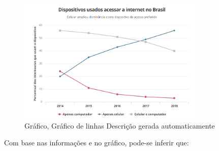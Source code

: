\begin{escolha}
\begin{boxmedio}
\begin{boxmedio}
{\begin{boxpeq}
\begin{boxpeq}
{\begin{boxpeq}
\begin{boxmedio}
\begin{boxmedio}
\begin{boxpeq}
\begin{boxmedio}
\begin{boxpeq}
\begin{boxpeq}
\begin{boxpeq}
\begin{boxpeq}
\begin{boxmedio}
{\begin{boxmedio}
\begin{boxmedio}
\begin{boxpeq}
\begin{boxmedio}
\begin{boxpeq}
\begin{boxpeq}
\begin{boxpeq}
\begin{escolha}
{\begin{boxmedio}
\begin{boxpeq}
\begin{boxpeq}
\begin{boxpeq}
\begin{boxpeq}
\begin{boxpeq}
\begin{boxmedio}
\begin{boxpeq}
\begin{boxpeq}
\begin{boxpeq}
{\begin{boxpeq}
\begin{boxmedio}
\begin{boxpeq}
\begin{boxpeq}
\begin{boxpeq}
{\begin{boxpeq}
\begin{boxmedio}
{\begin{boxpeq}
\begin{boxpeq}
\begin{boxmedio}
\begin{boxmedio}
\begin{boxpeq}
\begin{boxpeq}
{\begin{boxpeq}
\begin{boxpeq}
\begin{boxpeq}
\begin{boxpeq}
\begin{boxpeq}
\begin{escolha}
\begin{escolha}
{\begin{boxmedio}
\begin{boxpeq}
\begin{q°}
\begin{boxmedio}
\begin{boxpeq}
\begin{boxpeq}
\begin{boxmedio}
\begin{boxmedio}
\begin{boxmedio}
\begin{boxmedio}
\begin{figure}
\centering
\includegraphics[width=3.50825in,height=2.33333in]{./_SAEB_9_MAT/media/image226.png}
\caption{Gráfico, Gráfico de linhas Descrição gerada automaticamente}
\end{figure}


Com base nas informações e no gráfico, pode-se inferir que:

\begin{escolha}


\end{escolha}
\end{boxmedio}
\end{boxmedio}
\end{boxmedio}
\end{boxmedio}
\end{boxpeq}
\end{boxpeq}
\end{boxmedio}
\end{q°}
\end{boxpeq}
\end{boxmedio}}
\end{escolha}
\end{escolha}
\end{boxpeq}
\end{boxpeq}
\end{boxpeq}
\end{boxpeq}
\end{boxpeq}}
\end{boxpeq}
\end{boxpeq}
\end{boxmedio}
\end{boxmedio}
\end{boxpeq}
\end{boxpeq}}
\end{boxmedio}
\end{boxpeq}}
\end{boxpeq}
\end{boxpeq}
\end{boxpeq}
\end{boxmedio}
\end{boxpeq}}
\end{boxpeq}
\end{boxpeq}
\end{boxpeq}
\end{boxmedio}
\end{boxpeq}
\end{boxpeq}
\end{boxpeq}
\end{boxpeq}
\end{boxpeq}
\end{boxmedio}}
\end{escolha}
\end{boxpeq}
\end{boxpeq}
\end{boxpeq}
\end{boxmedio}
\end{boxpeq}
\end{boxmedio}
\end{boxmedio}}
\end{boxmedio}
\end{boxpeq}
\end{boxpeq}
\end{boxpeq}
\end{boxpeq}
\end{boxmedio}
\end{boxpeq}
\end{boxmedio}
\end{boxmedio}
\end{boxpeq}}
\end{boxpeq}
\end{boxpeq}}
\end{boxmedio}
\end{boxmedio}
\end{escolha}

